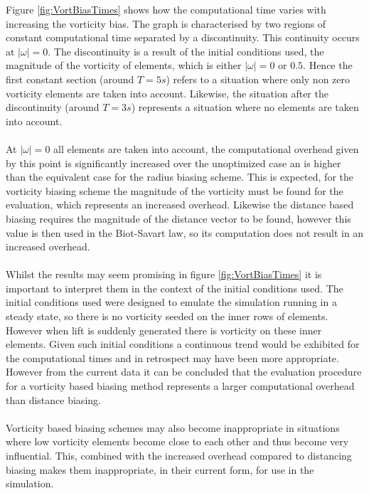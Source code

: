 Figure \ref{fig:VortBiasTimes} shows how the computational time varies with increasing the vorticity bias. The graph is characterised by two regions of constant computational time separated by a discontinuity. This continuity occurs at $|\omega|=0$. The discontinuity is a result of the initial conditions used, the magnitude of the vorticity of elements, which is either $|\omega|=0$ or $0.5$. Hence the first constant section (around $T=5s$) refers to a situation where only non zero vorticity elements are taken into account. Likewise, the situation after the discontinuity (around $T=3s$) represents a situation where no elements are taken into account.
\\\\
At $|\omega|=0$ all elements are taken into account, the computational overhead given by this point is significantly increased over the unoptimized case an is higher than the equivalent case for the radius biasing scheme. This is expected, for the vorticity biasing scheme the magnitude of the vorticity must be found for the evaluation, which represents an increased overhead. Likewise the distance based biasing requires the magnitude of the distance vector to be found, however this value is then used in the Biot-Savart law, so its computation does not result in an increased overhead.
\\\\
Whilst the results may seem promising in figure \ref{fig:VortBiasTimes} it is important to interpret them in the context of the initial conditions used. The initial conditions used were designed to emulate the simulation running in a steady state, so there is no vorticity seeded on the inner rows of elements. However when lift is suddenly generated there is vorticity on these inner elements. Given such initial conditions a continuous trend would be exhibited for the computational times and in retrospect may have been more appropriate. However from the current data it can be concluded that the evaluation procedure for a vorticity based biasing method represents a larger computational overhead than distance biasing.
\\\\
Vorticity based biasing schemes may also become inappropriate in situations where low vorticity elements become close to each other and thus become very influential. This, combined with the increased overhead compared to distancing biasing makes them inappropriate, in their current form, for use in the simulation.

